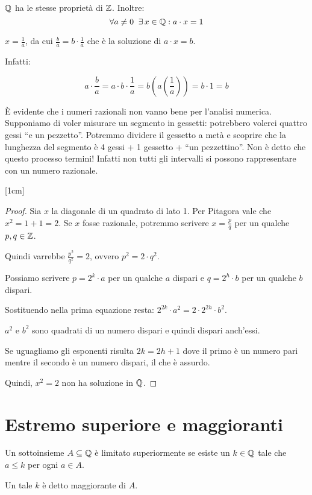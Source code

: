 $\mathbb Q$ ha le stesse proprietà di $\mathbb Z$. Inoltre:
\begin{equation*}
\forall a \neq 0 \;\; \exists\, x \in \mathbb Q : a \cdot x = 1
\end{equation*}

$x = \frac{1}{a}$, da cui $\frac{b}{a} = b \cdot \frac{1}{a}$ che è la soluzione di $a \cdot x = b$. 

Infatti:

\begin{equation*}
a \cdot \frac{b}{a} = a \cdot b \cdot \frac{1}{a} = b (a(\frac{1}{a})) = b \cdot 1 = b
\end{equation*}

È evidente che i numeri razionali non vanno bene per l'analisi numerica. Supponiamo di voler misurare un segmento in gessetti: potrebbero volerci quattro gessi ``e un pezzetto''. Potremmo dividere il gessetto a metà e scoprire che la lunghezza del segmento è 4 gessi + 1 gessetto + ``un pezzettino''. Non è detto che questo processo termini! Infatti non tutti gli intervalli si possono rappresentare con un numero razionale.  

[1cm]
\begin{proof}
Sia $x$ la diagonale di un quadrato di lato 1. Per Pitagora vale che $x^2 = 1 + 1 = 2$. Se $x$ fosse razionale, potremmo scrivere $x = \frac{p}{q}$ per un qualche $p,q \in \mathbb Z$. 

Quindi varrebbe $\frac{p^2}{q^2} = 2$, ovvero $p^2 = 2\cdot q^2$.

Possiamo scrivere $p = 2^k \cdot a$ per un qualche $a$ dispari e $q = 2^h \cdot b$ per un qualche $b$ dispari.

Sostituendo nella prima equazione resta: $2^{2k} \cdot a^2 = 2 \cdot 2^{2h} \cdot b^2$.

$a^2$ e $b^2$ sono quadrati di un numero dispari e quindi dispari anch'essi.

Se uguagliamo gli esponenti risulta $2k = 2h + 1$ dove il primo è un numero pari mentre il secondo è un numero dispari, il che è assurdo.

Quindi, $x^2 = 2$ non ha soluzione in $\mathbb Q$.
\end{proof}

\section{Estremo superiore e maggioranti}

\begin{definition}
Un sottoinsieme $A \subseteq \mathbb Q$ è limitato superiormente se esiste un $k \in \mathbb Q$ tale che $a \le k$ per ogni $a \in A$. 

Un tale $k$ è detto maggiorante di $A$.
\end{definition}

